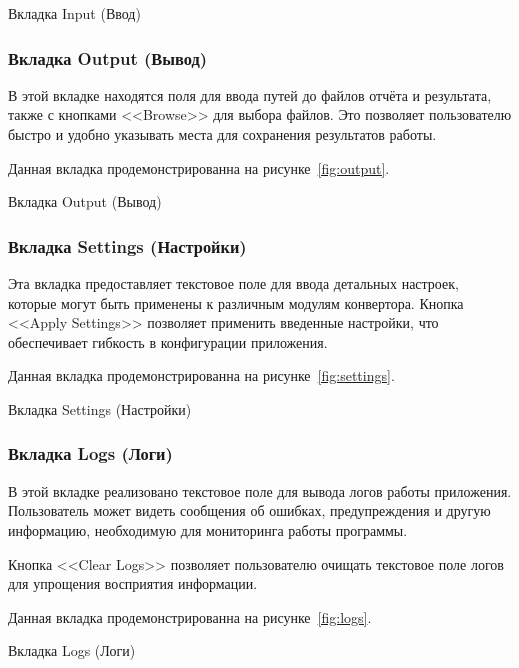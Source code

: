 \begin{image}
	\caption{Вкладка Input (Ввод)}
	\label{fig:input}
\end{image}

\subsubsection{Вкладка Output (Вывод)}

В этой вкладке находятся поля для ввода путей до файлов отчёта и результата,
также с кнопками <<Browse>> для выбора файлов.
Это позволяет пользователю быстро
и удобно указывать места для сохранения результатов работы.

Данная вкладка продемонстрированна на рисунке~\ref{fig:output}.

\begin{image}
	\caption{Вкладка Output (Вывод)}
	\label{fig:output}
\end{image}

\subsubsection{Вкладка Settings (Настройки)}

Эта вкладка предоставляет текстовое поле
для ввода детальных настроек,
которые могут быть применены к различным модулям конвертора.
Кнопка <<Apply Settings>> позволяет применить введенные настройки,
что обеспечивает гибкость в конфигурации приложения.

Данная вкладка продемонстрированна на рисунке~\ref{fig:settings}.

\begin{image}
	\caption{Вкладка Settings (Настройки)}
	\label{fig:settings}
\end{image}

\subsubsection{Вкладка Logs (Логи)}

В этой вкладке реализовано текстовое поле для вывода логов работы приложения.
Пользователь может видеть сообщения об ошибках,
предупреждения и другую информацию,
необходимую для мониторинга работы программы.

Кнопка <<Clear Logs>> позволяет пользователю очищать текстовое
поле логов для упрощения восприятия информации.

Данная вкладка продемонстрированна на рисунке~\ref{fig:logs}.

\begin{image}
	\caption{Вкладка Logs (Логи)}
	\label{fig:logs}
\end{image}

